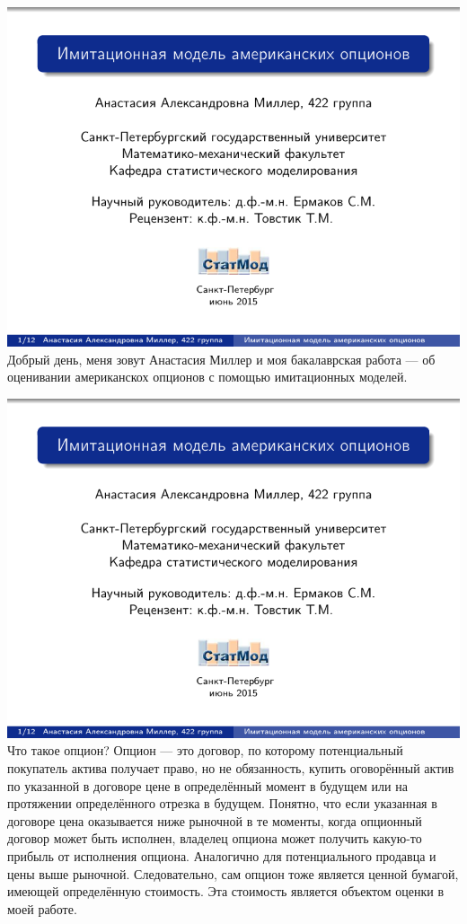 \documentclass[14pt,a4paper]{extarticle}
\begin{document}
\includegraphics[page=\theslidenumber, width=\textwidth]{8th-semester-presentation.pdf}
Добрый день, меня зовут Анастасия Миллер и моя бакалаврская работа --- об оценивании американскох опционов с помощью имитационных моделей.

\includegraphics[page=\theslidenumber, width=\textwidth]{8th-semester-presentation.pdf}
Что такое опцион? Опцион --- это договор, по которому потенциальный покупатель актива получает право, но не обязанность, купить оговорённый актив по указанной в договоре цене в определённый момент в будущем или на протяжении определённого отрезка в будущем. Понятно, что если указанная в договоре цена оказывается ниже рыночной в те моменты, когда опционный договор может быть исполнен, владелец опциона может получить какую-то прибыль от исполнения опциона. Аналогично для потенциального продавца и цены выше рыночной. Следовательно, сам опцион тоже является ценной бумагой, имеющей определённую стоимость. Эта стоимость является объектом оценки в моей работе.
\end{document}

